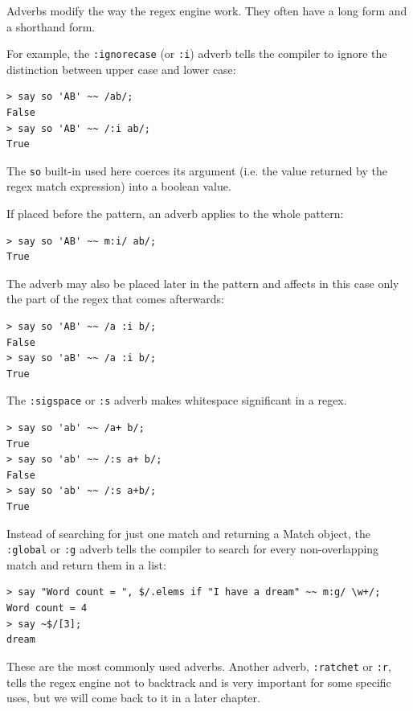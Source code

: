 Adverbs modify the way the regex engine work. They often have a 
long form and a shorthand form.

For example, the \verb':ignorecase' (or \verb':i') adverb 
tells the compiler to ignore the distinction between upper 
case and lower case: 

\begin{verbatim}
> say so 'AB' ~~ /ab/;
False
> say so 'AB' ~~ /:i ab/;
True
\end{verbatim}
%

The \verb'so' built-in used here coerces its argument (i.e. 
the value returned by the regex match expression) into 
a boolean value. 

If placed before the pattern, an adverb applies to the 
whole pattern:

\begin{verbatim}
> say so 'AB' ~~ m:i/ ab/;
True
\end{verbatim}
%

The adverb may also be placed later in the pattern and affects 
in this case only the part of the regex that comes afterwards:

\begin{verbatim}
> say so 'AB' ~~ /a :i b/;
False
> say so 'aB' ~~ /a :i b/;
True
\end{verbatim}
%

The \verb':sigspace' or \verb':s' adverb makes whitespace 
significant in a regex.

\begin{verbatim}
> say so 'ab' ~~ /a+ b/;
True
> say so 'ab' ~~ /:s a+ b/;
False
> say so 'ab' ~~ /:s a+b/;
True
\end{verbatim}
%

Instead of searching for just one match and returning a 
Match object, the \verb':global' or \verb':g' adverb tells
the compiler to search for every non-overlapping match 
and return them in a list:

\begin{verbatim}
> say "Word count = ", $/.elems if "I have a dream" ~~ m:g/ \w+/;
Word count = 4
> say ~$/[3];
dream
\end{verbatim}
%

These are the most commonly used adverbs. Another adverb, 
\verb':ratchet' or \verb':r', tells the regex engine 
not to backtrack and is very important for some specific 
uses, but we will come back to it in a later chapter.

